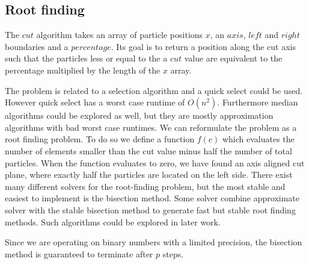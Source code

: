 \documentclass[]{article}
\begin{document}
\subsection{Root finding} \label{sec:root}




The $cut$ algorithm takes an array of particle positions $x$, an $axis$, $left$ and $right$ boundaries and a $percentage$. Its goal is to return a position along the cut axis such that the particles less or equal to the a $cut$ value are equivalent to the percentage multiplied by the length of the $x$ array.

The problem is related to a selection algorithm and a quick select\cite{algorithms} could be used. However quick select has a worst case runtime of $O(n^2)$. Furthermore median algorithms could be explored as well, but they are mostly approximation algorithms with bad worst case runtimes. We can reformulate the problem as a root finding problem. To do so we define a function $f(c)$ which evaluates the number of elements smaller than the cut value minus half the number of total particles. When the function evaluates to zero, we have found an axis aligned cut plane, where exactly half the particles are located on the left side. There exist many different solvers for the root-finding problem, but the most stable and easiest to implement is the bisection method. Some solver combine approximate solver with the stable bisection method to generate fast but stable root finding methods. Such algorithms could be explored in later work.

Since we are operating on binary numbers with a limited precision, the bisection method is guaranteed to terminate after $p$ steps.
\end{document}
